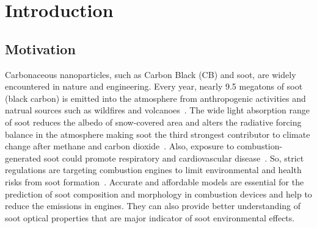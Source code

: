 \chapter{Introduction}

\section{Motivation}
Carbonaceous nanoparticles, such as Carbon Black (CB) and soot, are widely encountered in nature and engineering. Every year, nearly 9.5 megatons of soot (black carbon) is emitted into the atmosphere from anthropogenic activities and natrual sources such as wildfires and volcanoes~\citep{myhre2014anthropogenic}. The wide light absorption range of soot reduces the albedo of snow-covered area and alters the radiative forcing balance in the atmosphere making soot the third strongest contributor to climate change after methane and carbon dioxide~\citep{myhre2014anthropogenic}. Also, exposure to combustion-generated soot could promote respiratory and cardiovascular disease~\citep{world2013health}. So, strict regulations are targeting combustion engines to limit environmental and health risks from soot formation~\citep{integrated2019}. Accurate and affordable models are essential for the prediction of soot composition and morphology in combustion devices and help to reduce the emissions in engines. They can also provide better understanding of soot optical properties that are major indicator of soot environmental effects.

